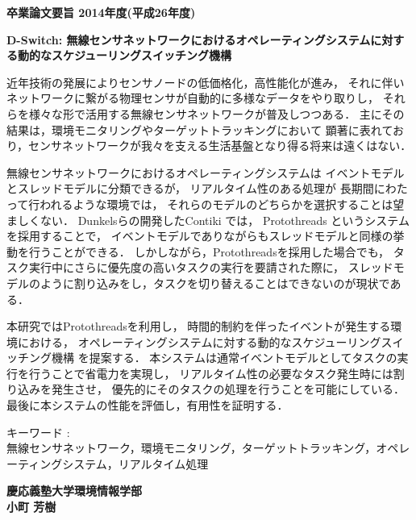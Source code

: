 \begin{center}
\textbf{\Large 卒業論文要旨 2014年度(平成26年度)}

\vspace{6.18mm}

\textbf{\Large D-Switch: 無線センサネットワークにおけるオペレーティングシステムに対する動的なスケジューリングスイッチング機構}
\end{center}

\vspace{10mm}
近年技術の発展によりセンサノードの低価格化，高性能化が進み，
それに伴いネットワークに繋がる物理センサが自動的に多様なデータをやり取りし，
それらを様々な形で活用する無線センサネットワークが普及しつつある．
主にその結果は，環境モニタリングやターゲットトラッキングにおいて
顕著に表れており，センサネットワークが我々を支える生活基盤となり得る将来は遠くはない．

無線センサネットワークにおけるオペレーティングシステムは
イベントモデルとスレッドモデルに分類できるが，
リアルタイム性のある処理が
長期間にわたって行われるような環境では，
それらのモデルのどちらかを選択することは望ましくない．
Dunkelsらの開発したContiki\cite{Dunkels:2004:CLF:1032658.1034117}
では，
Protothreads\cite{Dunkels:2006:PSE:1182807.1182811}
というシステムを採用することで，
イベントモデルでありながらもスレッドモデルと同様の挙動を行うことができる．
しかしながら，Protothreadsを採用した場合でも，
タスク実行中にさらに優先度の高いタスクの実行を要請された際に，
スレッドモデルのように割り込みをし，タスクを切り替えることはできないのが現状である．

本研究ではProtothreadsを利用し，
時間的制約を伴ったイベントが発生する環境における，
オペレーティングシステムに対する動的なスケジューリングスイッチング機構
を提案する．
本システムは通常イベントモデルとしてタスクの実行を行うことで省電力を実現し，
リアルタイム性の必要なタスク発生時には割り込みを発生させ，
優先的にそのタスクの処理を行うことを可能にしている．
最後に本システムの性能を評価し，有用性を証明する．


\vspace{10mm}
キーワード :\\
\hspace{3.5em}無線センサネットワーク，環境モニタリング，ターゲットトラッキング，オペレーティングシステム，リアルタイム処理

\begin{flushright}
\textbf{慶応義塾大学環境情報学部}\\
\textbf{小町 芳樹}
\end{flushright}

